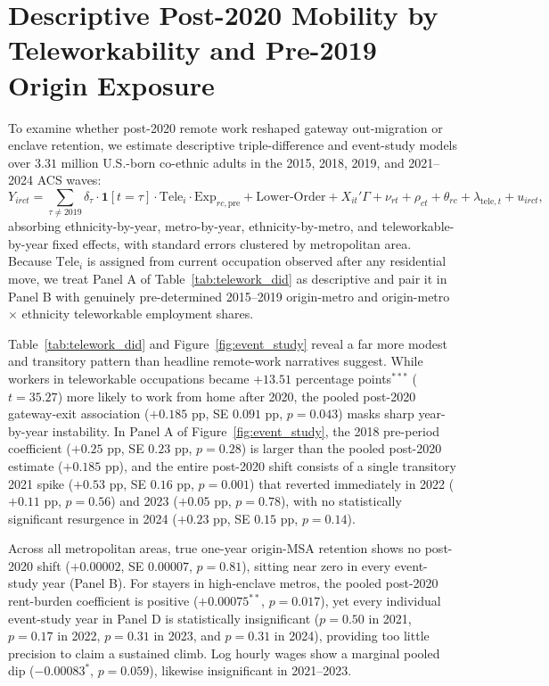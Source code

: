 \documentclass[11pt]{article}
\begin{document}
\section{Descriptive Post-2020 Mobility by Teleworkability and Pre-2019 Origin Exposure}

To examine whether post-2020 remote work reshaped gateway out-migration or enclave retention, we estimate descriptive triple-difference and event-study models over $3.31$ million U.S.-born co-ethnic adults in the 2015, 2018, 2019, and 2021--2024 ACS waves:
\begin{equation}
Y_{irct} = \sum_{\tau \ne 2019} \delta_\tau \cdot \mathbf{1}[t=\tau] \cdot \text{Tele}_i \cdot \text{Exp}_{rc,\text{pre}} + \text{Lower-Order} + X_{it}'\Gamma + \nu_{rt} + \rho_{ct} + \theta_{rc} + \lambda_{\text{tele},t} + u_{irct},
\end{equation}
absorbing ethnicity-by-year, metro-by-year, ethnicity-by-metro, and teleworkable-by-year fixed effects, with standard errors clustered by metropolitan area. Because $\text{Tele}_i$ is assigned from current occupation observed after any residential move, we treat Panel A of Table~\ref{tab:telework_did} as descriptive and pair it in Panel B with genuinely pre-determined 2015--2019 origin-metro and origin-metro $\times$ ethnicity teleworkable employment shares.



Table~\ref{tab:telework_did} and Figure~\ref{fig:event_study} reveal a far more modest and transitory pattern than headline remote-work narratives suggest. While workers in teleworkable occupations became $+13.51$ percentage points$^{***}$ ($t = 35.27$) more likely to work from home after 2020, the pooled post-2020 gateway-exit association ($+0.185$ pp, SE $0.091$ pp, $p = 0.043$) masks sharp year-by-year instability. In Panel A of Figure~\ref{fig:event_study}, the 2018 pre-period coefficient ($+0.25$ pp, SE $0.23$ pp, $p = 0.28$) is larger than the pooled post-2020 estimate ($+0.185$ pp), and the entire post-2020 shift consists of a single transitory 2021 spike ($+0.53$ pp, SE $0.16$ pp, $p = 0.001$) that reverted immediately in 2022 ($+0.11$ pp, $p = 0.56$) and 2023 ($+0.05$ pp, $p = 0.78$), with no statistically significant resurgence in 2024 ($+0.23$ pp, SE $0.15$ pp, $p = 0.14$).

Across all metropolitan areas, true one-year origin-MSA retention shows no post-2020 shift ($+0.00002$, SE $0.00007$, $p = 0.81$), sitting near zero in every event-study year (Panel B). For stayers in high-enclave metros, the pooled post-2020 rent-burden coefficient is positive ($+0.00075^{**}$, $p = 0.017$), yet every individual event-study year in Panel D is statistically insignificant ($p = 0.50$ in 2021, $p = 0.17$ in 2022, $p = 0.31$ in 2023, and $p = 0.31$ in 2024), providing too little precision to claim a sustained climb. Log hourly wages show a marginal pooled dip ($-0.00083^{*}$, $p = 0.059$), likewise insignificant in 2021--2023.
\end{document}
